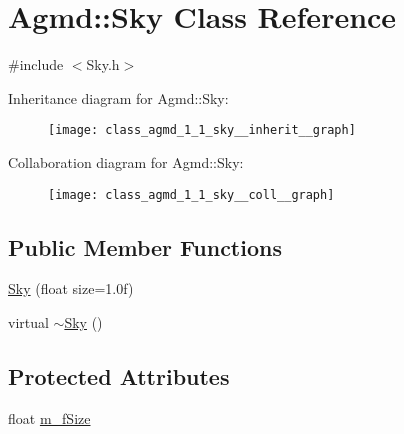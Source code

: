 \hypertarget{class_agmd_1_1_sky}{\section{Agmd\+:\+:Sky Class Reference}
\label{class_agmd_1_1_sky}
}


{\ttfamily \#include $<$Sky.\+h$>$}



Inheritance diagram for Agmd\+:\+:Sky\+:\nopagebreak
\begin{figure}[H]
\begin{center}
\leavevmode
\texttt{[image: class\_agmd\_1\_1\_sky\_\_inherit\_\_graph]}
\end{center}
\end{figure}


Collaboration diagram for Agmd\+:\+:Sky\+:\nopagebreak
\begin{figure}[H]
\begin{center}
\leavevmode
\texttt{[image: class\_agmd\_1\_1\_sky\_\_coll\_\_graph]}
\end{center}
\end{figure}
\subsection*{Public Member Functions}
\begin{DoxyCompactItemize}
\item 
\hyperlink{class_agmd_1_1_sky_a4394c6b0e5e3b36689f33491d4863539}{Sky} (float size=1.\+0f)
\item 
virtual \hyperlink{class_agmd_1_1_sky_af5fd48df91dd65d19cf14286bfeafef8}{$\sim$\+Sky} ()
\end{DoxyCompactItemize}
\subsection*{Protected Attributes}
\begin{DoxyCompactItemize}
\item 
float \hyperlink{class_agmd_1_1_sky_a39f71193184fd17b072aaaf48f964832}{m\+\_\+f\+Size}
\end{DoxyCompactItemize}


